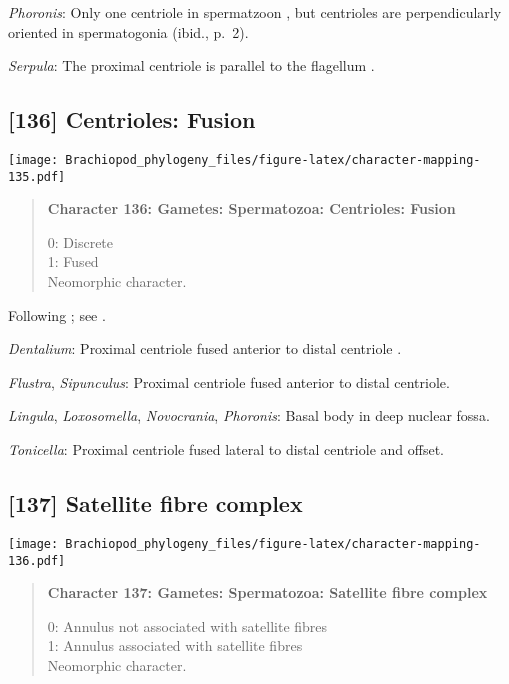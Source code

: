 \documentclass[openany]{book}
\theoremstyle{definition}
\theoremstyle{definition}
\theoremstyle{definition}
\theoremstyle{remark}
\begin{document}
\hypertarget{Phoronis-coding-135}{}
\emph{Phoronis}: Only one centriole in spermatzoon
\citep[p.~7]{Reunov2004Ultrastructuralstudy}, but centrioles are
perpendicularly oriented in spermatogonia (ibid., p.~2).

\hypertarget{Serpula-coding-135}{}
\emph{Serpula}: The proximal centriole is parallel to the flagellum
\citep{Gherardi2011}.

\subsection*{{[}136{]} Centrioles: Fusion}\label{centrioles-fusion}

\texttt{[image: Brachiopod\_phylogeny\_files/figure-latex/character-mapping-135.pdf]}

\begin{quote}
\textbf{Character 136: Gametes: Spermatozoa: Centrioles: Fusion}

0: Discrete\\
1: Fused\\
Neomorphic character.
\end{quote}

Following \citet{Smith2012}; see \citet{BucklandNicks2008}.

\hypertarget{Dentalium-coding-136}{}
\emph{Dentalium}: Proximal centriole fused anterior to distal centriole
\citep{DufresneDube1983}.

\hypertarget{Flustra-coding-136}{}
\emph{Flustra}, \emph{Sipunculus}: Proximal centriole fused anterior to
distal centriole.

\hypertarget{Lingula-coding-136}{}
\emph{Lingula}, \emph{Loxosomella}, \emph{Novocrania}, \emph{Phoronis}:
Basal body in deep nuclear fossa.

\hypertarget{Tonicella-coding-136}{}
\emph{Tonicella}: Proximal centriole fused lateral to distal centriole
and offset.

\subsection*{{[}137{]} Satellite fibre
complex}\label{satellite-fibre-complex}

\texttt{[image: Brachiopod\_phylogeny\_files/figure-latex/character-mapping-136.pdf]}

\begin{quote}
\textbf{Character 137: Gametes: Spermatozoa: Satellite fibre complex}

0: Annulus not associated with satellite fibres\\
1: Annulus associated with satellite fibres\\
Neomorphic character.
\end{quote}
\end{document}
